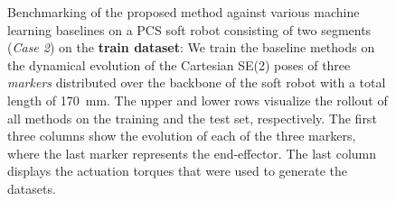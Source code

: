 \begin{figure}[ht]
    \caption{Benchmarking of the proposed method against various machine learning baselines on a PCS soft robot consisting of two segments (\emph{Case 2}) on the \textbf{train dataset}: We train the baseline methods on the dynamical evolution of the Cartesian SE(2) poses of three \emph{markers} distributed over the backbone of the soft robot with a total length of \SI{170}{mm}. The upper and lower rows visualize the rollout of all methods on the training and the test set, respectively. The first three columns show the evolution of each of the three markers, where the last marker represents the end-effector. The last column displays the actuation torques that were used to generate the datasets.}
    \label{fig:pcsregression:dynamics_pcs_ns-2_with_baselines:training}
\end{figure}
\begin{figure}[ht]
    \centering
    \\

\end{figure}

